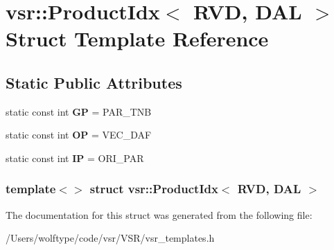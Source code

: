 \hypertarget{structvsr_1_1_product_idx_3_01_r_v_d_00_01_d_a_l_01_4}{\section{vsr\-:\-:Product\-Idx$<$ R\-V\-D, D\-A\-L $>$ Struct Template Reference}
\label{structvsr_1_1_product_idx_3_01_r_v_d_00_01_d_a_l_01_4}
}
\subsection*{Static Public Attributes}
\begin{DoxyCompactItemize}
\item 
\hypertarget{structvsr_1_1_product_idx_3_01_r_v_d_00_01_d_a_l_01_4_a7f8fc427b73dd53b2fd9a964c930dc65}{static const int {\bfseries G\-P} = P\-A\-R\-\_\-\-T\-N\-B}\label{structvsr_1_1_product_idx_3_01_r_v_d_00_01_d_a_l_01_4_a7f8fc427b73dd53b2fd9a964c930dc65}

\item 
\hypertarget{structvsr_1_1_product_idx_3_01_r_v_d_00_01_d_a_l_01_4_af624825e9b75899034896ca4e97b5da3}{static const int {\bfseries O\-P} = V\-E\-C\-\_\-\-D\-A\-F}\label{structvsr_1_1_product_idx_3_01_r_v_d_00_01_d_a_l_01_4_af624825e9b75899034896ca4e97b5da3}

\item 
\hypertarget{structvsr_1_1_product_idx_3_01_r_v_d_00_01_d_a_l_01_4_a62b1b9d505b1c45819350ea72591cd19}{static const int {\bfseries I\-P} = O\-R\-I\-\_\-\-P\-A\-R}\label{structvsr_1_1_product_idx_3_01_r_v_d_00_01_d_a_l_01_4_a62b1b9d505b1c45819350ea72591cd19}

\end{DoxyCompactItemize}
\subsubsection*{template$<$$>$ struct vsr\-::\-Product\-Idx$<$ R\-V\-D, D\-A\-L $>$}



The documentation for this struct was generated from the following file\-:\begin{DoxyCompactItemize}
\item 
/\-Users/wolftype/code/vsr/\-V\-S\-R/vsr\-\_\-templates.\-h\end{DoxyCompactItemize}
